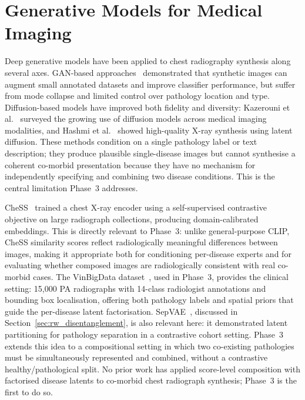 
\section{Generative Models for Medical Imaging}
\label{sec:rw_medical}

Deep generative models have been applied to chest radiography synthesis along several
axes. GAN-based approaches~\citep{gan_medical_image_augmentation_2018,
medical_image_synthesis_gans_2018} demonstrated that synthetic images can augment small
annotated datasets and improve classifier performance, but suffer from mode collapse and
limited control over pathology location and type. Diffusion-based models have improved
both fidelity and diversity: Kazerouni et al.~\citep{kazerouni2022diffusion} surveyed
the growing use of diffusion models across medical imaging modalities, and Hashmi et
al.~\citep{hashmi2024xreal} showed high-quality X-ray synthesis using latent diffusion.
These methods condition on a single pathology label or text description; they produce
plausible single-disease images but cannot synthesise a coherent co-morbid presentation
because they have no mechanism for independently specifying and combining two disease
conditions. This is the central limitation Phase~3 addresses.

CheSS~\citep{NEURIPS2022_123d3e81} trained a chest X-ray encoder using a
self-supervised contrastive objective on large radiograph collections, producing
domain-calibrated embeddings. This is directly relevant to Phase~3: unlike general-purpose
CLIP, CheSS similarity scores reflect radiologically meaningful differences between
images, making it appropriate both for conditioning per-disease experts and for evaluating
whether composed images are radiologically consistent with real co-morbid cases. The
VinBigData dataset~\citep{nguyen2022vindr}, used in Phase~3, provides the clinical
setting: 15{,}000 PA radiographs with 14-class radiologist annotations and bounding box
localisation, offering both pathology labels and spatial priors that guide the per-disease
latent factorisation. SepVAE~\citep{louiset2024sepvae}, discussed in
Section~\ref{sec:rw_disentanglement}, is also relevant here: it demonstrated latent
partitioning for pathology separation in a contrastive cohort setting. Phase~3 extends
this idea to a compositional setting in which two co-existing pathologies must be
simultaneously represented and combined, without a contrastive healthy/pathological split.
No prior work has applied score-level composition with factorised disease latents to
co-morbid chest radiograph synthesis; Phase~3 is the first to do so.
